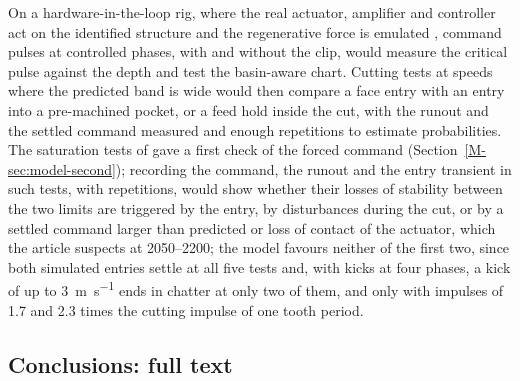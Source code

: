 On a hardware-in-the-loop rig, where the real actuator, amplifier and controller act on the identified structure and the regenerative force is emulated \citep{sahu2021bistability,sahu2023adaptive,mancisidor2019mechatronics}, command pulses at controlled phases, with and without the clip, would measure the critical pulse against the depth and test the basin-aware chart. Cutting tests at speeds where the predicted band is wide would then compare a face entry with an entry into a pre-machined pocket, or a feed hold inside the cut, with the runout and the settled command measured and enough repetitions to estimate probabilities. The saturation tests of \citet{ozsoy2025frequency} gave a first check of the forced command (Section~\ref{M-sec:model-second}); recording the command, the runout and the entry transient in such tests, with repetitions, would show whether their losses of stability between the two limits are triggered by the entry, by disturbances during the cut, or by a settled command larger than predicted or loss of contact of the actuator, which the article suspects at 2050--\SI{2200}{\rpm}; the model favours neither of the first two, since both simulated entries settle at all five tests and, with kicks at four phases, a kick of up to \SI{3}{\metre\per\second} ends in chatter at only two of them, and only with impulses of 1.7 and 2.3 times the cutting impulse of one tooth period.

\subsection{Conclusions: full text}\label{supp:std-conclusions}

